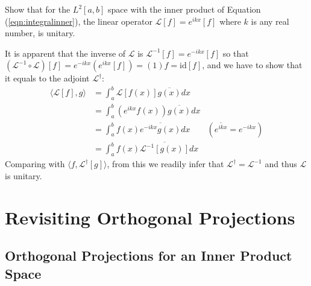\begin{exmp}
Show that for the $L^2[a,b]$ space with the inner product of Equation (\ref{eqn:integralinner}), the linear operator $\mathcal{L}[f] = e^{ikx}[f]$ where $k$ is any real number, is unitary.
\end{exmp}
\begin{solution}
It is apparent that the inverse of $\mathcal{L}$ is $\mathcal{L}^{-1}[f] = e^{-ikx}[f]$ so that $(\mathcal{L}^{-1} \circ \mathcal{L})[f] = e^{-ikx}(e^{ikx}[f]) = (1)f = \text{id}[f]$, and we have to show that it equals to the adjoint $\mathcal{L}^\dag$:
\begin{align*}
\langle \mathcal{L}[f], g \rangle &= \int_a^b \mathcal{L}[f(x)] \overline{g(x)} dx \\
&= \int_a^b (e^{ikx}f(x)) \overline{g(x)} dx \\
&= \int_a^b f(x) \overline{e^{-ikx}g(x)} dx & (\overline{e^{ikx}} = e^{-ikx}) \\
&= \int_a^b f(x) \overline{\mathcal{L}^{-1}[g(x)]} dx
\end{align*}
Comparing with $\langle f, \mathcal{L}^\dag[g] \rangle$, from this we readily infer that $\mathcal{L}^\dag = \mathcal{L}^{-1}$ and thus $\mathcal{L}$ is unitary.
\end{solution}

\section{Revisiting Orthogonal Projections}
\label{section:orthoproj}

\subsection{Orthogonal Projections for an Inner Product Space}

